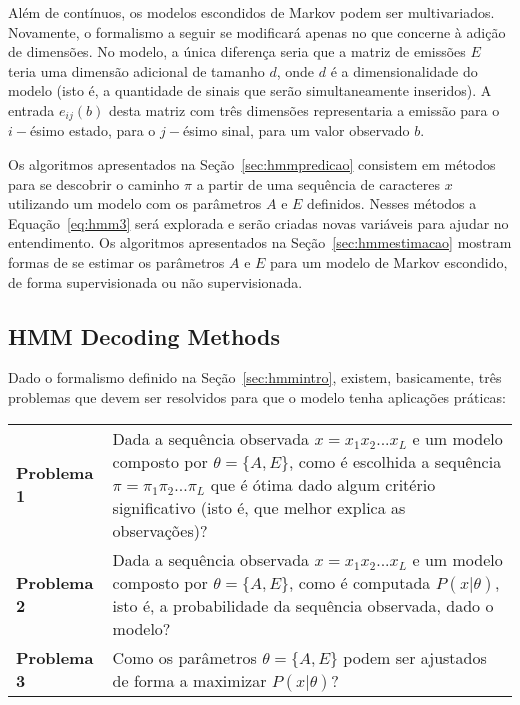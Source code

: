 Além de contínuos, os modelos escondidos de Markov podem ser multivariados. Novamente, o formalismo a seguir se modificará apenas no que concerne à adição de dimensões. No modelo, a única diferença seria que a matriz de emissões $ E $ teria uma dimensão adicional de tamanho $ d $, onde $ d $ é a dimensionalidade do modelo (isto é, a quantidade de sinais que serão simultaneamente inseridos). A entrada $ e_{ij}(b) $ desta matriz com três dimensões representaria a emissão para o $i-$ésimo estado, para o $j-$ésimo sinal, para um valor observado $ b $.

Os algoritmos apresentados na Seção~\ref{sec:hmmpredicao} consistem em métodos para se descobrir o caminho $ \pi $ a partir de uma sequência de caracteres $ x $ utilizando um modelo com os parâmetros $ A $ e $ E $ definidos. Nesses métodos a Equação~\ref{eq:hmm3} será explorada e serão criadas novas variáveis para ajudar no entendimento. Os algoritmos apresentados na Seção~\ref{sec:hmmestimacao} mostram formas de se estimar os parâmetros $ A $ e $ E $ para um modelo de Markov escondido, de forma supervisionada ou não supervisionada.

\subsection{HMM Decoding Methods}
\label{sec:hmm.decoding.methods}

Dado o formalismo definido na Seção~\ref{sec:hmmintro}, existem, basicamente, três problemas que devem ser resolvidos para que o modelo tenha aplicações práticas:

\begin{center}
  \begin{tabular}{lp{.8\linewidth}}
    {\bf Problema 1} & Dada a sequência observada $ x = x_1 x_2 ... x_L $ e um modelo composto por $ \theta = \{A,E\} $, como é escolhida a sequência $ \pi = \pi_1 \pi_2 ... \pi_L $ que é ótima dado algum critério significativo (isto é, que melhor explica as observações)? \\[0.2cm]
    {\bf Problema 2} & Dada a sequência observada $ x = x_1 x_2 ... x_L $ e um modelo composto por $ \theta = \{A,E\} $, como é computada $ P(x|\theta) $, isto é, a probabilidade da sequência observada, dado o modelo? \\[0.2cm]
    {\bf Problema 3} & Como os parâmetros $ \theta = \{A,E\} $ podem ser ajustados de forma a maximizar $ P(x|\theta) $? \\[0.2cm]
  \end{tabular}
\end{center}

